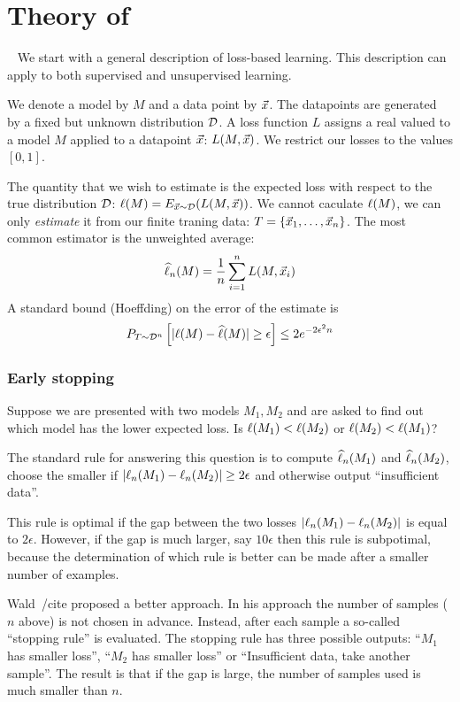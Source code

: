 \section{Theory of \tmsn}~\label{sec:theory}
We start with a general description of loss-based learning. This
description can apply to both supervised and unsupervised learning.

We denote a model by $M$ and a data point by $\vec{x}$. The datapoints are
generated by a fixed but unknown distribution ${\cal D}$. A loss function $L$
assigns a real valued to a model $M$ applied to a datapoint $\vec{x}$:
$L(M,\vec{x})$. We restrict our losses to the values $[0,1]$.

The quantity that we wish to estimate is the expected loss with
respect to the true distribution ${\cal D}$: $\ell(M) = E_{\vec{x} \sim
  {\cal D}}(L(M,\vec{x}))$. We cannot caculate $\ell(M)$, we can only
{\em estimate} it from our finite traning data: $T = \{ \vec{x}_1, \ldots,
\vec{x}_n\}$. The most common estimator is the unweighted average:
$$ \widehat{\ell}_n(M) = \frac{1}{n} \sum_{i=1}^n L(M,\vec{x}_i)$$
A standard bound (Hoeffding) on the error of the estimate is
\begin{equation} \label{eqn:hoeffding}
P_{T \sim {\cal D}^n}\left[|\ell(M) - \widehat{\ell}(M)| \geq \epsilon \right] \leq
2e^{-2 \epsilon^2 n}
\end{equation}

\subsubsection*{Early stopping}
Suppose we are presented with two models $M_1,M_2$ and are asked to
find out which model has the lower expected loss. Is 
$\ell(M_1)<\ell(M_2)$ or $\ell(M_2)<\ell(M_1)$?

The standard rule for answering this question is to compute
$\widehat{\ell}_n(M_1)$ and $\widehat{\ell}_n(M_2)$, choose the smaller if
$|\ell_n(M_1)-\ell_n(M_2)| \geq 2\epsilon$ and otherwise output
``insufficient data''.

This rule is optimal if the gap between the two losses
$|\ell_n(M_1)-\ell_n(M_2)|$ is equal to $2\epsilon$. However, if the
gap is much larger, say $10\epsilon$ then this rule is subpotimal,
because the determination of which rule is better can be made after a
smaller number of examples.

Wald~/cite{} proposed a better approach. In his approach the number of
samples ($n$ above) is not chosen in advance. Instead, after each sample a
so-called ``stopping rule'' is evaluated. The stopping rule has three
possible outputs: ``$M_1$ has smaller loss'', ``$M_2$ has smaller
loss'' or ``Insufficient data, take another sample''. The result is
that if the gap is large, the number of samples used is much smaller
than $n$.

